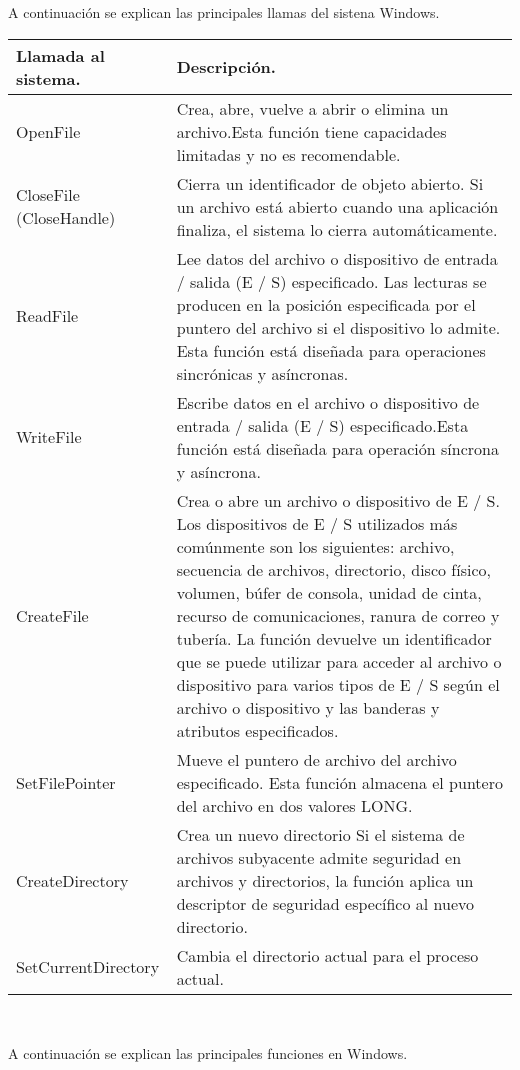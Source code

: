 \documentclass[12pt]{article}
\begin{document}
A continuación se explican las principales llamas del sistena Windows.\\

			\begin{tabular}{
			|p{5cm}|p{10cm}||}
			\hline
			\textbf{ Llamada al sistema.} & \textbf{ Descripción.}\\ 
			\hline
			\hline OpenFile &Crea, abre, vuelve a abrir o elimina un archivo.Esta función tiene capacidades limitadas y no es recomendable.
			\\
			\hline CloseFile (CloseHandle)& Cierra un identificador de objeto abierto. Si un archivo está abierto cuando una aplicación finaliza, el sistema lo cierra automáticamente.\\
			\hline ReadFile & Lee datos del archivo o dispositivo de entrada / salida (E / S) especificado. Las lecturas se producen en la posición especificada por el puntero del archivo si el dispositivo lo admite. Esta función está diseñada para operaciones sincrónicas y asíncronas.\\
			\hline WriteFile & Escribe datos en el archivo o dispositivo de entrada / salida (E / S) especificado.Esta función está diseñada para operación síncrona y asíncrona.\\
			\hline CreateFile & Crea o abre un archivo o dispositivo de E / S. Los dispositivos de E / S utilizados más comúnmente son los siguientes: archivo, secuencia de archivos, directorio, disco físico, volumen, búfer de consola, unidad de cinta, recurso de comunicaciones, ranura de correo y tubería. La función devuelve un identificador que se puede utilizar para acceder al archivo o dispositivo para varios tipos de E / S según el archivo o dispositivo y las banderas y atributos especificados. \\
			\hline SetFilePointer &Mueve el puntero de archivo del archivo especificado. Esta función almacena el puntero del archivo en dos valores LONG.\\
			\hline CreateDirectory & Crea un nuevo directorio Si el sistema de archivos subyacente admite seguridad en archivos y directorios, la función aplica un descriptor de seguridad específico al nuevo directorio.\\
			\hline SetCurrentDirectory & Cambia el directorio actual para el proceso actual.\\
			\end{tabular}\\
			\newpage
			
A continuación se explican las principales funciones en Windows.\\
			
\end{document}
